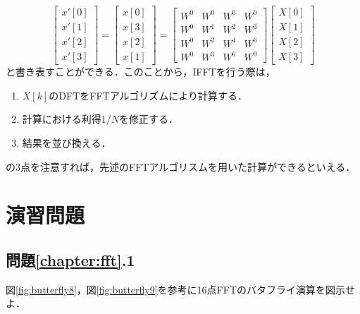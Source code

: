 \begin{equation}
\begin{bmatrix}
x'[0] \\
x'[1] \\
x'[2] \\
x'[3]
\end{bmatrix}
=
\begin{bmatrix}
x[0] \\
x[3] \\
x[2] \\
x[1]
\end{bmatrix}
=
\begin{bmatrix}
W^0 & W^0 & W^0 & W^0 \\
W^0 & W^{1} & W^{2} & W^{3} \\
W^0 & W^{2} & W^{4} & W^{6} \\
W^0 & W^{3} & W^{6} & W^{9}
\end{bmatrix}
\begin{bmatrix}
X[0] \\
X[1] \\
X[2] \\
X[3]
\end{bmatrix}
\label{eqn:fft14}
\end{equation}
と書き表すことができる．このことから，IFFTを行う際は，
\begin{enumerate}
\item $X[k]$のDFTをFFTアルゴリズムにより計算する．
\item 計算における利得$1/N$を修正する．
\item 結果を並び換える．
\end{enumerate}
の3点を注意すれば，先述のFFTアルゴリスムを用いた計算ができるといえる．

\section*{演習問題}

\subsection*{問題\ref{chapter:fft}.1}

図\ref{fig:butterfly8}，図\ref{fig:butterfly9}を参考に16点FFTのバタフライ演算を図示せよ．





